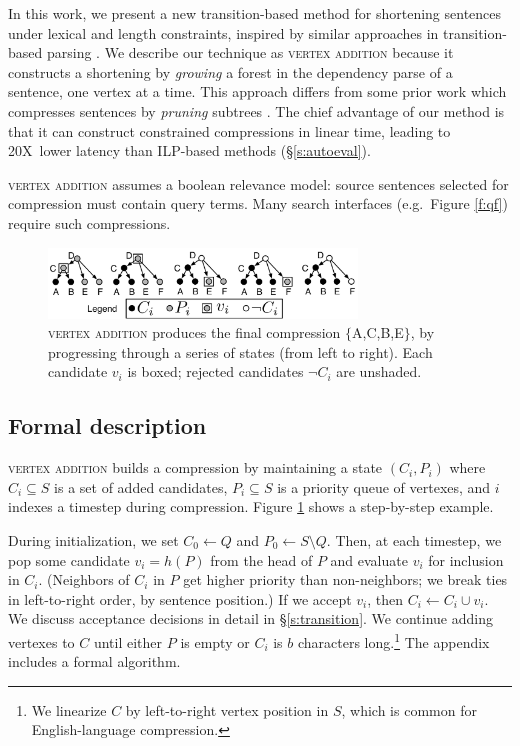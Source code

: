 \documentclass[11pt,a4paper]{article}
\newcommand{\speedup}[0]{20X~}
\begin{document}
In this work, we present a new transition-based method for shortening sentences under lexical and length constraints, inspired by similar approaches in transition-based parsing \cite{nivre2003}. We describe our technique as \textsc{vertex addition} because it constructs a shortening by \textit{growing} a forest in the dependency parse of a sentence, one vertex at a time. This approach differs from some prior work which
compresses sentences by \textit{pruning} subtrees \cite{Knight2000StatisticsBasedS,berg2011jointly,almeida2013fast,Filippova2015FastKS}. The chief advantage of our method is that it can construct constrained compressions in linear time, leading to \speedup lower latency than ILP-based methods (\S\ref{s:autoeval}). 

\textsc{vertex addition} assumes a boolean relevance model: source sentences selected for compression must contain query terms. Many search interfaces (e.g.\ Figure \ref{f:qf}) require such compressions.
\begin{figure}[h]
\includegraphics[width=8.2cm]{additive.pdf}
\caption{\textsc{vertex addition} produces the final compression $\{$A,C,B,E$\}$, by progressing through a series of states (from left to right). Each candidate $v_i$ is boxed; rejected candidates $\neg C_i$ are unshaded.}
\label{f:walkthru}
\end{figure}

\subsection{Formal description}\label{s:formal}

\textsc{vertex addition} builds a compression by maintaining a state
$(C_i,P_i)$ where $C_i \subseteq S$ is a set of added candidates, $P_i  \subseteq S$ is a priority queue of vertexes, and $i$ indexes a timestep during compression. Figure \ref{f:walkthru} shows a step-by-step example. 

During initialization, we set $C_0 \gets Q$ and $P_0 \gets S \setminus Q$. Then, at each timestep, we pop some candidate $v_i =h(P)$ from the head of $P$ and evaluate $v_i$ for inclusion in $C_i$. (Neighbors of $C_i$ in $P$ get higher priority than non-neighbors; we break ties in left-to-right order, by sentence position.) If we accept $v_i$, then $C_i \gets C_i \cup v_i$. We discuss acceptance decisions in detail in \S\ref{s:transition}. We continue adding vertexes to $C$ until either $P$ is empty or $C_i$ is $b$ characters long.\footnote{We linearize $C$ by left-to-right vertex position in $S$, which is common for English-language compression.} The appendix includes a formal algorithm. 
\end{document}
